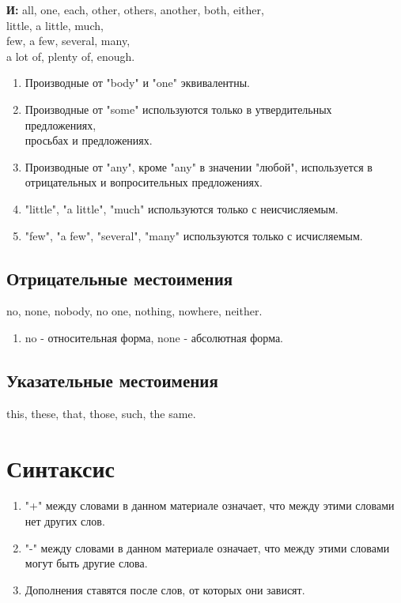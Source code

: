 \documentclass[oneside]{book}
\begin{document}
    \textbf{И:} all, one, each, other, others, another,
    both, either,
    \\
    little, a little, much,
    \\
    few, a few, several, many,
    \\
    a lot of, plenty of, enough.

    \begin{enumerate}
        \item Производные от "body"{ }и "one"{ }эквивалентны.

        \item Производные от "some"{ }используются только в
        утвердительных предложениях, \\
        просьбах и предложениях.

        \item Производные от "any"{}, кроме "any"{ }в значении
        "любой"{}, используется в отрицательных
        и вопросительных предложениях.

        \item "little"{}, "a little"{}, "much"{ }используются только
        с неисчисляемым.

        \item "few"{}, "a few"{}, "several"{}, "many"{ }используются
        только с исчисляемым.
    \end{enumerate}

    \section{Отрицательные местоимения}
    no, none, nobody, no one, nothing, nowhere,
    neither.

    \begin{enumerate}
        \item no - относительная форма,
        none - абсолютная форма.
    \end{enumerate}

    \section{Указательные местоимения}
    this, these, that, those, such, the same.

    \chapter{Синтаксис}
    \begin{enumerate}
        \item "+"{ }между словами в данном материале означает,
        что между этими словами нет других слов.

        \item "{}-{}"{ }между словами в данном материале означает,
        что между этими словами могут быть другие слова.

        \item Дополнения ставятся после слов, от которых они зависят.
    \end{enumerate}
\end{document}
